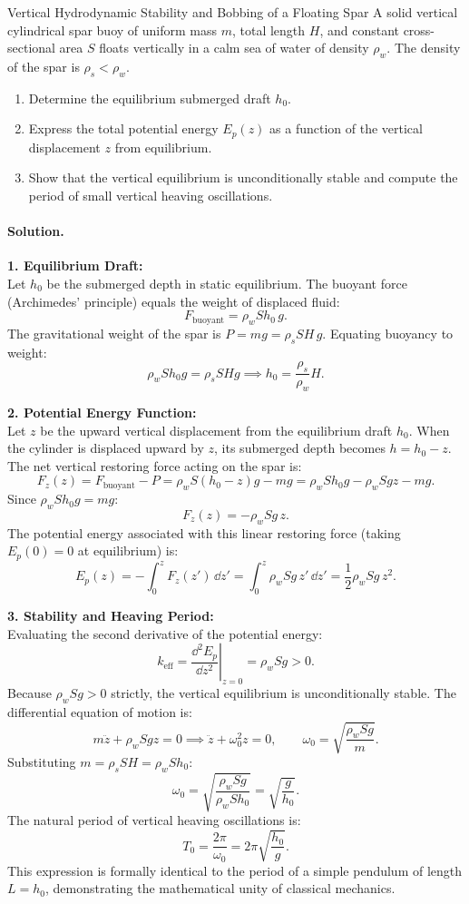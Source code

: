 \begin{workedexample}{Vertical Hydrodynamic Stability and Bobbing of a Floating Spar}
A solid vertical cylindrical spar buoy of uniform mass $m$, total length $H$, and constant cross-sectional area $S$ floats vertically in a calm sea of water of density $\rho_w$. The density of the spar is $\rho_s < \rho_w$.
\begin{enumerate}[leftmargin=1.4em,itemsep=3pt]
  \item Determine the equilibrium submerged draft $h_0$.
  \item Express the total potential energy $E_p(z)$ as a function of the vertical displacement $z$ from equilibrium.
  \item Show that the vertical equilibrium is unconditionally stable and compute the period of small vertical heaving oscillations.
\end{enumerate}

\paragraph{Solution.}
\textbf{1. Equilibrium Draft:}\\
Let $h_0$ be the submerged depth in static equilibrium. The buoyant force (Archimedes' principle) equals the weight of displaced fluid:
\[
F_{\text{buoyant}} = \rho_w S h_0\, g.
\]
The gravitational weight of the spar is $P = m g = \rho_s S H\, g$.
Equating buoyancy to weight:
\[
\rho_w S h_0 g = \rho_s S H g \implies h_0 = \frac{\rho_s}{\rho_w} H.
\]

\textbf{2. Potential Energy Function:}\\
Let $z$ be the upward vertical displacement from the equilibrium draft $h_0$. When the cylinder is displaced upward by $z$, its submerged depth becomes $h = h_0 - z$.
The net vertical restoring force acting on the spar is:
\[
F_z(z) = F_{\text{buoyant}} - P = \rho_w S (h_0 - z) g - mg = \rho_w S h_0 g - \rho_w S g z - mg.
\]
Since $\rho_w S h_0 g = mg$:
\[
F_z(z) = -\rho_w S g\, z.
\]
The potential energy associated with this linear restoring force (taking $E_p(0) = 0$ at equilibrium) is:
\[
E_p(z) = -\int_0^z F_z(z')\,\dd z' = \int_0^z \rho_w S g\, z'\,\dd z' = \frac{1}{2} \rho_w S g\, z^2.
\]

\textbf{3. Stability and Heaving Period:}\\
Evaluating the second derivative of the potential energy:
\[
k_{\text{eff}} = \left.\frac{\dd^2 E_p}{\dd z^2}\right|_{z = 0} = \rho_w S g > 0.
\]
Because $\rho_w S g > 0$ strictly, the vertical equilibrium is unconditionally stable.
The differential equation of motion is:
\[
m \ddot{z} + \rho_w S g z = 0 \implies \ddot{z} + \omega_0^2 z = 0, \qquad \omega_0 = \sqrt{\frac{\rho_w S g}{m}}.
\]
Substituting $m = \rho_s S H = \rho_w S h_0$:
\[
\omega_0 = \sqrt{\frac{\rho_w S g}{\rho_w S h_0}} = \sqrt{\frac{g}{h_0}}.
\]
The natural period of vertical heaving oscillations is:
\[
T_0 = \frac{2\pi}{\omega_0} = 2\pi\sqrt{\frac{h_0}{g}}.
\]
This expression is formally identical to the period of a simple pendulum of length $L = h_0$, demonstrating the mathematical unity of classical mechanics.
\end{workedexample}
